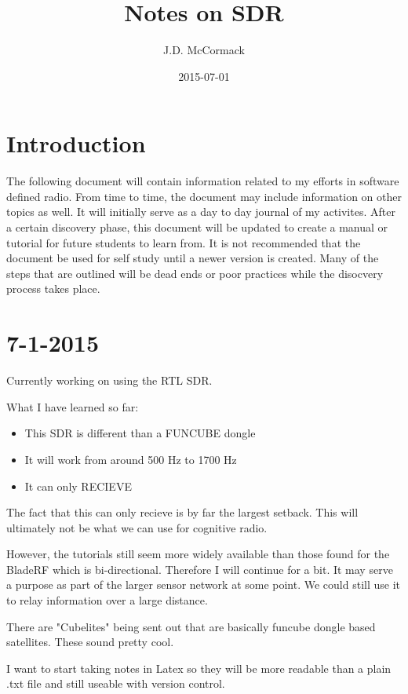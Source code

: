 \documentclass{article}
\title{Notes on SDR}
\date{2015-07-01}
\author{J.D. McCormack}
\begin{document}
	\maketitle
	\newpage
	
	\section{Introduction}

	The following document will contain information related to my efforts in software defined radio.
	From time to time, the document may include information on other topics as well. It will initially
	serve as a day to day journal of my activites. After a certain discovery phase, this document will
	be updated to create a manual or tutorial for future students to learn from. It is not recommended
	that the document be used for self study until a newer version is created. Many of the steps 
	that are outlined will be dead ends or poor practices while the disocvery process takes place. 

	\newpage

	\section{7-1-2015}

	Currently working on using the RTL SDR. 

	What I have learned so far: 
		\begin{itemize}
			\item This SDR is different than a FUNCUBE dongle
			\item It will work from around 500 Hz to 1700 Hz
			\item It can only RECIEVE 
		\end{itemize}
	The fact that this can only recieve is by far the largest setback.
	This will ultimately not be what we can use for cognitive radio. 

	However, the tutorials still seem more widely available than those
	found for the BladeRF which is bi-directional. Therefore I will
	continue for a bit. It may serve a purpose as part of the larger 
	sensor network at some point. We could still use it to relay information
	over a large distance. 

	There are "Cubelites" being sent out that are basically funcube dongle
	based satellites. These sound pretty cool. 

	I want to start taking notes in Latex so they will be more readable than
	a plain .txt file and still useable with version control. 
\end{document}
